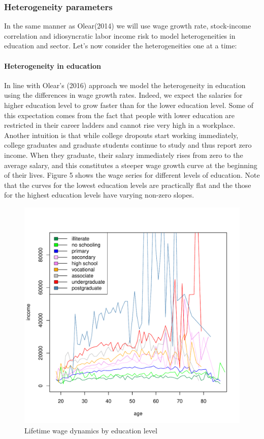 \documentclass[]{article}
\begin{document}
\subsubsection{Heterogeneity parameters}
In the same manner as Olear(2014) we will use wage growth rate, stock-income correlation and idiosyncratic labor income risk to model heterogeneities in education and sector. Let's now consider the heterogeneities one at a time:

\paragraph{Heterogeneity in education}
In line with Olear's (2016) approach we model the heterogeneity in education using the differences in wage growth rates. Indeed, we expect the salaries for higher education level to grow faster than for the lower education level. Some of this expectation comes from the fact that people with lower education are restricted in their career ladders and cannot rise very high in a workplace. Another intuition is that while college dropouts start working immediately, college graduates and graduate students continue to study and thus report zero income. When they graduate, their salary immediately rises from zero to the average salary, and this constitutes a steeper wage growth curve at the beginning of their lives. Figure 5 shows the wage series for different levels of education. Note that the curves for the lowest education levels are practically flat and the those for the highest education levels have varying non-zero slopes. 

\begin{figure}[h]
	\centering
	\includegraphics[scale=0.6]{figs/wage2educ.pdf}
	\caption{Lifetime wage dynamics by education level}
\end{figure}
\end{document}
